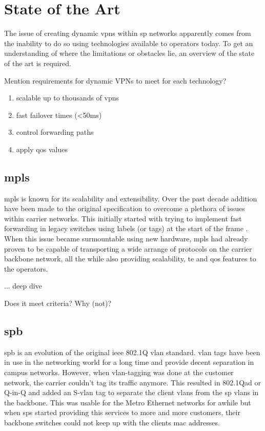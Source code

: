 \section{State of the Art} %
\label{sec:state_of_the_art}

The issue of creating dynamic \acp{vpn} within \ac{sp} networks apparently comes from the inability to do so using technologies available to operators today. To get an understanding of where the limitations or obstacles lie, an overview of the state of the art is required.

Mention requirements for dynamic VPNs to meet for each technology?

\begin{enumerate}
	\item scalable up to thousands of \acp{vpn}
	\item fast failover times (<50ms)
	\item control forwarding paths
	\item apply \ac{qos} values
\end{enumerate}

\subsection{\acs{mpls}} %
\label{sub:mpls}
\ac{mpls} is known for its scalability and extensibility. Over the past decade addition have been made to the original specification to overcome a plethora of issues within carrier networks. This initially started with trying to implement fast forwarding in legacy switches using labels (or tags) at the start of the frame \cite{tag-switching}. When this issue became surmountable using new hardware, \ac{mpls} had already proven to be capable of transporting a wide arrange of protocols on the carrier backbone network, all the while also providing scalability, \ac{te} and \ac{qos} features to the operators.

... deep dive

Does it meet criteria? Why (not)?


\subsection{\acs{spb}} %
\label{sub:spb}
\ac{spb} is an evolution of the original \acs{ieee} 802.1Q \ac{vlan} standard. \ac{vlan} tags have been in use in the networking world for a long time and provide decent separation in campus networks. However, when \ac{vlan}-tagging was done at the customer network, the carrier couldn't tag its traffic anymore. This resulted in 802.1Qad or Q-in-Q and added an S-\ac{vlan} tag to separate the client \acp{vlan} from the \ac{sp} \acp{vlan} in the backbone. This was usable for the Metro Ethernet networks for awhile but when \acp{sp} started providing this services to more and more customers, their backbone switches could not keep up with the clients \ac{mac} addresses.

